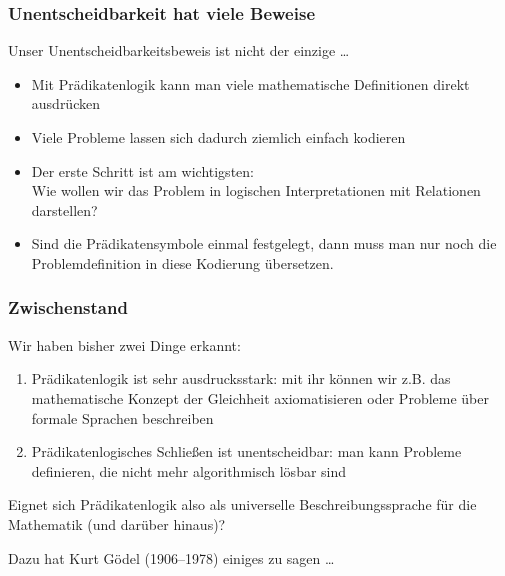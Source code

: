 \documentclass[onlymath]{beamer}
\begin{document}
\begin{frame}\frametitle{Unentscheidbarkeit hat viele Beweise}

Unser Unentscheidbarkeitsbeweis ist nicht der einzige \ldots
\begin{itemize}
\item Mit Prädikatenlogik kann man viele mathematische Definitionen
direkt ausdrücken
\item Viele Probleme lassen sich dadurch ziemlich einfach kodieren
\item Der erste Schritt ist am wichtigsten:\\
	Wie wollen wir das Problem in logischen Interpretationen mit Relationen darstellen?
\item Sind die Prädikatensymbole einmal festgelegt, dann muss man nur noch
die Problemdefinition in diese Kodierung übersetzen.
\end{itemize}\pause


\end{frame}


\begin{frame}\frametitle{Zwischenstand}

Wir haben bisher zwei Dinge erkannt:
\begin{enumerate}[(1)]
\item \alert{Prädikatenlogik ist sehr ausdrucksstark:}
mit ihr können wir z.B. das mathematische Konzept der Gleichheit axiomatisieren oder
Probleme über formale Sprachen beschreiben
\item \alert{Prädikatenlogisches Schließen ist unentscheidbar:}
man kann Probleme definieren, die nicht mehr algorithmisch lösbar sind
\end{enumerate}

Eignet sich Prädikatenlogik also als universelle Beschreibungssprache für
die Mathematik (und darüber hinaus)?
\bigskip

Dazu hat Kurt Gödel (1906--1978) einiges zu sagen \ldots

\end{frame}
\end{document}
